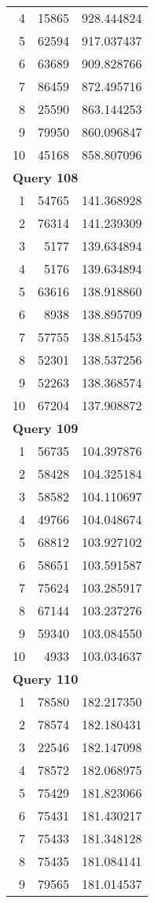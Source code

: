 \begin{longtable}[{p}]{@{}rrp{}@{}}
4 & 15865 & 928.444824 \\
5 & 62594 & 917.037437 \\
6 & 63689 & 909.828766 \\
7 & 86459 & 872.495716 \\
8 & 25590 & 863.144253 \\
9 & 79950 & 860.096847 \\
10 & 45168 & 858.807096 \\
\midrule
\multicolumn{3}{l}{\bfseries Query 108} \\
1 & 54765 & 141.368928 \\
2 & 76314 & 141.239309 \\
3 & 5177 & 139.634894 \\
4 & 5176 & 139.634894 \\
5 & 63616 & 138.918860 \\
6 & 8938 & 138.895709 \\
7 & 57755 & 138.815453 \\
8 & 52301 & 138.537256 \\
9 & 52263 & 138.368574 \\
10 & 67204 & 137.908872 \\
\midrule
\multicolumn{3}{l}{\bfseries Query 109} \\
1 & 56735 & 104.397876 \\
2 & 58428 & 104.325184 \\
3 & 58582 & 104.110697 \\
4 & 49766 & 104.048674 \\
5 & 68812 & 103.927102 \\
6 & 58651 & 103.591587 \\
7 & 75624 & 103.285917 \\
8 & 67144 & 103.237276 \\
9 & 59340 & 103.084550 \\
10 & 4933 & 103.034637 \\
\midrule
\multicolumn{3}{l}{\bfseries Query 110} \\
1 & 78580 & 182.217350 \\
2 & 78574 & 182.180431 \\
3 & 22546 & 182.147098 \\
4 & 78572 & 182.068975 \\
5 & 75429 & 181.823066 \\
6 & 75431 & 181.430217 \\
7 & 75433 & 181.348128 \\
8 & 75435 & 181.084141 \\
9 & 79565 & 181.014537 \\

\end{longtable}
